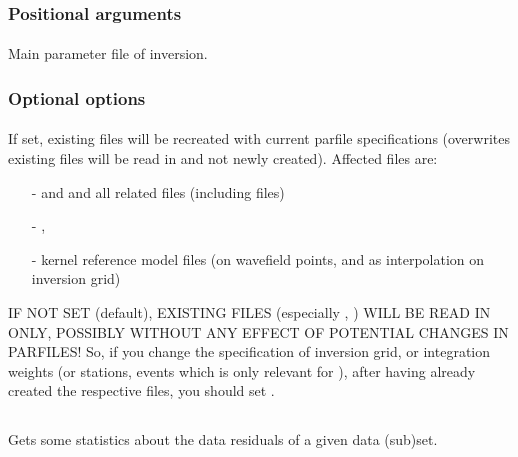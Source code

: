 \subsubsection{Positional arguments}
\paragraph{}
Main parameter file of inversion.
\subsubsection{Optional options}
\paragraph{}
If set, existing files will be recreated with current parfile specifications (overwrites existing files will be read in and not newly created). Affected files are:
\begin{itemize}
\item[-] and  and all related  files (including  files)
\item[-], 
\item[-]kernel reference model files (on wavefield points, and as interpolation on inversion grid)
\end{itemize}
IF NOT SET (default), EXISTING FILES (especially , ) WILL BE READ IN ONLY, 
POSSIBLY WITHOUT ANY EFFECT OF POTENTIAL CHANGES IN PARFILES! So, if you change the specification of inversion grid, 
or integration weights (or stations, events which is only relevant for  ), 
after having already created the respective files, you should set .
%
%
\subsection{} \label{programs_scripts,sec:bin_prog,sec:invest_data_residuals}
Gets some statistics about the data residuals of a given data (sub)set.
